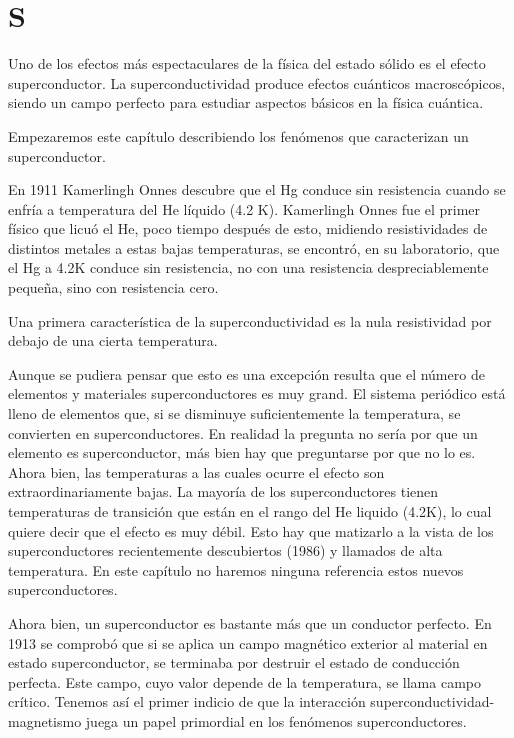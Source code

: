 \chapter{S}

Uno de los efectos más espectaculares de la física del estado sólido es el efecto superconductor. La superconductividad produce efectos cuánticos macroscópicos, siendo un campo perfecto para estudiar aspectos básicos en la física cuántica.

Empezaremos este capítulo describiendo los fenómenos que caracterizan un superconductor.

En 1911 Kamerlingh Onnes descubre que el Hg conduce sin resistencia cuando se enfría a temperatura del He líquido (4.2 K). Kamerlingh Onnes fue el primer físico que licuó el He, poco tiempo después de esto, midiendo resistividades de distintos metales a estas bajas temperaturas, se encontró, en su laboratorio, que el Hg a 4.2K conduce sin resistencia, no con una resistencia despreciablemente pequeña, sino con resistencia cero.

Una primera característica de la superconductividad es la nula resistividad por debajo de una cierta temperatura.

Aunque se pudiera pensar que esto es una excepción resulta que el número de elementos y materiales superconductores es muy grand. El sistema periódico está lleno de elementos que, si se disminuye suficientemente la temperatura, se convierten en superconductores. En realidad la pregunta no sería por que un elemento es superconductor, más bien hay que preguntarse por que no lo es. Ahora bien, las temperaturas a las cuales ocurre el efecto son extraordinariamente bajas. La mayoría de los superconductores tienen temperaturas de transición que están en el rango del He liquido (4.2K), lo cual quiere decir que el efecto es muy débil. Esto hay que matizarlo a la vista de los superconductores recientemente descubiertos (1986) y llamados de alta temperatura. En este capítulo no haremos ninguna referencia  estos nuevos superconductores.

Ahora bien, un superconductor es bastante más que un conductor perfecto. En 1913 se comprobó que si se aplica un campo magnético exterior al material en estado superconductor, se terminaba por destruir el estado de conducción perfecta. Este campo, cuyo valor depende de la temperatura, se llama campo crítico. Tenemos así el primer indicio de que la interacción superconductividad-magnetismo juega un papel primordial en los fenómenos superconductores.

